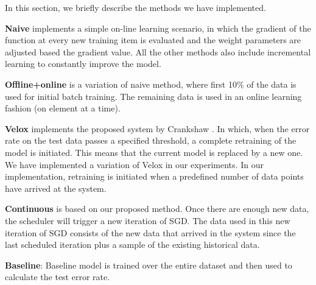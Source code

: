 \documentclass{sig-alternate-05-2015}
\begin{document}
In this section, we briefly describe the methods we have implemented.

\textbf{Naive} implements a simple on-line learning scenario, in which the gradient of the function at every new training item is evaluated and the weight parameters are adjusted based the gradient value. 
All the other methods also include incremental learning to constantly improve the model.

\textbf{Offline+online} is a variation of naive method, where first 10\% of the data is used for initial batch training.
The remaining data is used in an online learning fashion (on element at a time). 

\textbf{Velox} implements the proposed system by Crankshaw \cite{crankshaw2014missing}. 
In which, when the error rate on the test data passes a specified threshold, a complete retraining of the model is initiated. 
This means that the current model is replaced by a new one. 
We have implemented a variation of Velox in our experiments. 
In our implementation, retraining is initiated when a predefined number of data points have arrived at the system. 

\textbf{Continuous} is based on our proposed method. 
Once there are enough new data, the scheduler will trigger a new iteration of SGD. 
The data used in this new iteration of SGD consists of the new data that arrived in the system since the last scheduled iteration plus a sample of the existing historical data.

\textbf{Baseline}: Baseline model is trained over the entire dataset and then used to calculate the test error rate. 
\end{document}
